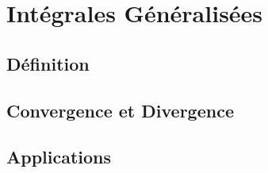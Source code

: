 \chapter{Intégrales Généralisées}\label{int}
\section{Définition}\label{int:def}
\section{Convergence et Divergence}\label{int:comp}
\section{Applications}\label{int:app}
